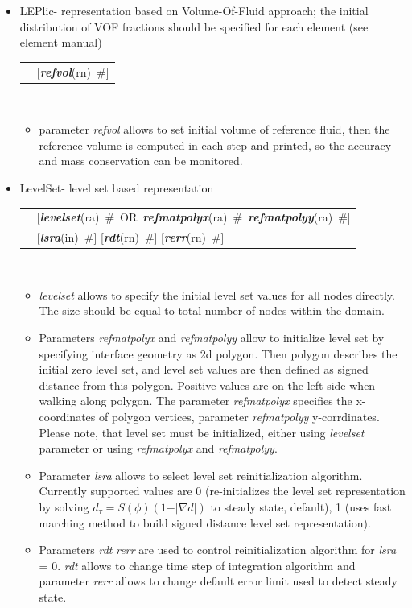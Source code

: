 \documentclass[a4paper]{article}
\makeatletter
\newcommand{\grad}{\nabla}
\newcommand{\param}[1]{{\em #1}}
\newcommand{\keywordnotype}[1]{\mbox{{\it{\bf{#1}}}}}
\newcommand{\keyword}[2]{\mbox{{\keywordnotype{#1}\tiny (#2)}}}
\newcommand{\field}[2]{\mbox{\keyword{#1}{#2}~\#}}
\newcommand{\optField}[2]{\mbox{[\field{#1}{#2}]}}
\newenvironment{record}[1][]{\begin{tabular}{|ll}}{\end{tabular}\\}
\newcommand{\recentry}[2]{{#1}&{#2}\\}
\newcounter{rcc}
\newenvironment{record}[1][\textwidth]{\setcounter{rcc}{0}\begin{tabular*}{#1}{|ll@{\extracolsep{\fill}}r}}{\end{tabular*}\\}
\newcommand{\recentry}[2]{\ifthenelse{\value{rcc}>0}{&$\backslash$ \\}{\setcounter{rcc}{1}}{#1}&{#2}}
\makeatother
\begin{document}
\begin{itemize}
\item LEPlic- representation based on Volume-Of-Fluid approach; the initial distribution of VOF fractions should be specified for each element (see element manual)\\
  \begin{record}[0.9\textwidth]
    \recentry{}{\optField{refvol}{rn}}
  \end{record}
\begin{itemize}
\item
parameter \param{refvol} allows to set initial volume of reference fluid, then the reference volume is computed in each step and printed, so the accuracy and mass conservation can be monitored.
\end{itemize}
\item[]
LevelSet- level set based representation\\
\begin{record}[0.9\textwidth]
\recentry{}{\mbox{[\field{levelset}{ra} OR \field{refmatpolyx}{ra} \field{refmatpolyy}{ra}]}}
\recentry{}{\optField{lsra}{in} \optField{rdt}{rn} \optField{rerr}{rn}}
\end{record}
\begin{itemize}
\item \param{levelset} allows to specify the initial level set values for all nodes directly. The size should be equal to total number of nodes within the domain. 
\item Parameters \param{refmatpolyx} and \param{refmatpolyy} allow to initialize level set by specifying interface geometry as 2d polygon. Then polygon describes the initial zero level set, and level set values are then defined as signed distance from this polygon. Positive values are on the left side when walking along polygon. The parameter \param{refmatpolyx} specifies the x-coordinates of polygon vertices, parameter \param{refmatpolyy} y-corrdinates. Please note, that level set must be initialized, either using \param{levelset} parameter or using \param{refmatpolyx} and \param{refmatpolyy}.
\item Parameter \param{lsra} allows to select level set reinitialization algorithm. Currently supported values are 0 (re-initializes the level set representation by solving $d_{\tau} = S(\phi)(1-\vert\grad d\vert)$ to steady state, default), 1 (uses fast  marching method to build signed distance level set representation).
\item Parameters \param{rdt} \param{rerr} are used to control reinitialization algorithm for \param{lsra} = 0. \param{rdt} allows to change time step of integration algorithm and parameter \param{rerr} allows to change default error limit used to detect steady state.
\end{itemize}
\end{itemize}
\end{document}
